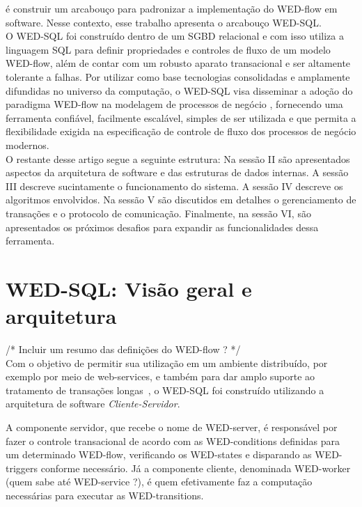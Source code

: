 \documentclass[conference]{IEEEtran}
\begin{document}
é construir um arcabouço para padronizar a implementação do WED-flow em software. Nesse contexto, esse trabalho apresenta
o arcabouço WED-SQL.
\\
\indent O WED-SQL foi construído dentro de um SGBD relacional e com isso utiliza a linguagem SQL para definir propriedades
e controles de fluxo de um modelo WED-flow, além de contar com um robusto aparato transacional e ser altamente tolerante
a falhas. Por utilizar como base tecnologias consolidadas e amplamente difundidas no universo da computação, o WED-SQL visa 
disseminar a adoção do paradigma WED-flow na modelagem de processos de negócio , fornecendo uma ferramenta confiável, facilmente
escalável, simples de ser utilizada e que permita a flexibilidade exigida na especificação de controle de fluxo dos processos
de negócio modernos.
\\
\indent O restante desse artigo segue a seguinte estrutura: Na sessão II são apresentados aspectos da arquitetura de software 
e das estruturas de dados internas. A sessão III descreve sucintamente o funcionamento do sistema. A sessão IV descreve
os algoritmos envolvidos. Na sessão V são discutidos em detalhes o gerenciamento de transações e o protocolo de comunicação.
Finalmente, na sessão VI, são apresentados os próximos desafios para expandir as funcionalidades dessa ferramenta. 
  

\section{WED-SQL: Visão geral e arquitetura}
/* Incluir um resumo das definições do WED-flow ? */\\
Com o objetivo de permitir sua utilização em um ambiente distribuído, por exemplo por meio de web-services, e também para dar
amplo suporte ao tratamento de transações longas~\cite{MOLINA}, o WED-SQL foi construído utilizando a arquitetura de 
software \emph{Cliente-Servidor}. 

\par A componente servidor, que recebe o nome de WED-server, é responsável por fazer o controle transacional de acordo com 
as WED-conditions definidas para um determinado WED-flow, verificando os WED-states e disparando as WED-triggers conforme 
necessário. Já a componente cliente, denominada WED-worker (quem sabe até WED-service ?), é quem efetivamente faz a computação
necessárias para executar as WED-transitions.
\\
\end{document}
